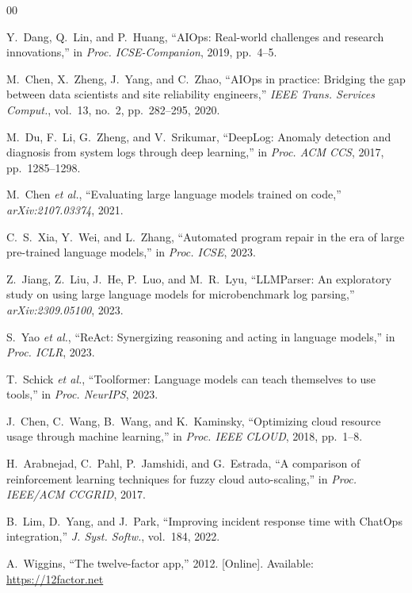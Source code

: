 \documentclass{ieeeaccess}
\begin{document}
\begin{thebibliography}{00}

Y.~Dang, Q.~Lin, and P.~Huang, ``AIOps: Real-world challenges and research innovations,'' in \textit{Proc. ICSE-Companion}, 2019, pp.~4--5.

M.~Chen, X.~Zheng, J.~Yang, and C.~Zhao, ``AIOps in practice: Bridging the gap between data scientists and site reliability engineers,'' \textit{IEEE Trans. Services Comput.}, vol.~13, no.~2, pp.~282--295, 2020.

M.~Du, F.~Li, G.~Zheng, and V.~Srikumar, ``DeepLog: Anomaly detection and diagnosis from system logs through deep learning,'' in \textit{Proc. ACM CCS}, 2017, pp.~1285--1298.

M.~Chen \textit{et al.}, ``Evaluating large language models trained on code,'' \textit{arXiv:2107.03374}, 2021.

C.~S.~Xia, Y.~Wei, and L.~Zhang, ``Automated program repair in the era of large pre-trained language models,'' in \textit{Proc. ICSE}, 2023.

Z.~Jiang, Z.~Liu, J.~He, P.~Luo, and M.~R.~Lyu, ``LLMParser: An exploratory study on using large language models for microbenchmark log parsing,'' \textit{arXiv:2309.05100}, 2023.

S.~Yao \textit{et al.}, ``ReAct: Synergizing reasoning and acting in language models,'' in \textit{Proc. ICLR}, 2023.

T.~Schick \textit{et al.}, ``Toolformer: Language models can teach themselves to use tools,'' in \textit{Proc. NeurIPS}, 2023.

J.~Chen, C.~Wang, B.~Wang, and K.~Kaminsky, ``Optimizing cloud resource usage through machine learning,'' in \textit{Proc. IEEE CLOUD}, 2018, pp.~1--8.

H.~Arabnejad, C.~Pahl, P.~Jamshidi, and G.~Estrada, ``A comparison of reinforcement learning techniques for fuzzy cloud auto-scaling,'' in \textit{Proc. IEEE/ACM CCGRID}, 2017.

B.~Lim, D.~Yang, and J.~Park, ``Improving incident response time with ChatOps integration,'' \textit{J. Syst. Softw.}, vol.~184, 2022.

A.~Wiggins, ``The twelve-factor app,'' 2012. [Online]. Available: \url{https://12factor.net}


\end{thebibliography}
\end{document}
